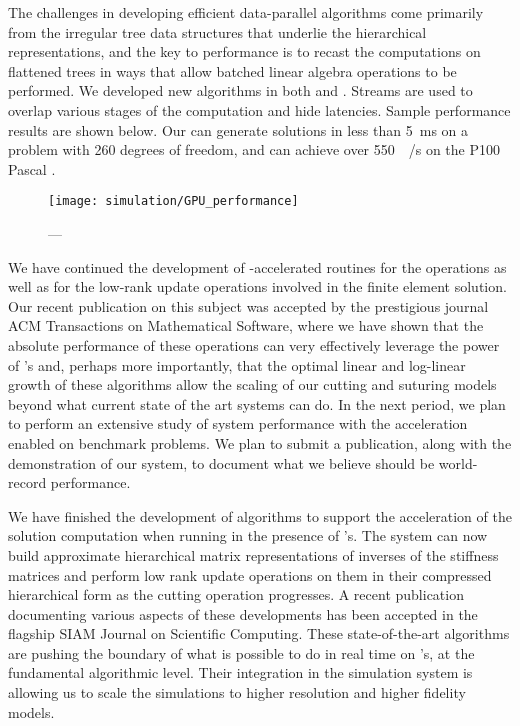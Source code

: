 The challenges in developing efficient data-parallel  algorithms come primarily from the irregular tree data structures that underlie the hierarchical representations, and the key to performance is to recast the computations on flattened trees in ways that allow batched linear algebra operations to be performed. We developed new  algorithms in both  and . Streams are used to overlap various stages of the computation and hide latencies. Sample performance results are shown below. Our  can generate solutions in less than \SI{5}{\milli\second} on a problem with \SI{260}{\kilo} degrees of freedom, and can achieve over \SI{550}{\giga\byte/\second} on the P100 Pascal .

\begin{figure}
  \centering%
	\texttt{[image: simulation/GPU\_performance]}
	\caption{---}\label{fig:gpu_performance}
\end{figure}

We have continued the development of -accelerated routines for the  operations as well as for the low-rank update operations involved in the finite element solution. Our recent publication on this subject was accepted by the prestigious journal ACM Transactions on Mathematical Software, where we have shown that the absolute performance of these operations can very effectively leverage the power of 's and, perhaps more importantly, that the optimal linear and log-linear growth of these algorithms allow the scaling of our cutting and suturing models beyond what current state of the art systems can do.  In the next period, we plan to perform an extensive study of system performance with the  acceleration enabled on benchmark problems. We plan to submit a publication, along with the demonstration of our system, to document what we believe should be world-record performance.

We have finished the development of algorithms to support the acceleration of the solution computation when running in the presence of 's.  The system can now build approximate hierarchical matrix representations of inverses of the stiffness matrices and perform low rank update operations on them in their compressed hierarchical form as the cutting operation progresses. A recent publication documenting various aspects of these developments has been accepted in the flagship SIAM Journal on Scientific Computing. These state-of-the-art algorithms are pushing the boundary of what is possible to do in real time on 's, at the fundamental algorithmic level. Their integration in the simulation system is allowing us to scale the simulations to higher resolution and higher fidelity models.

